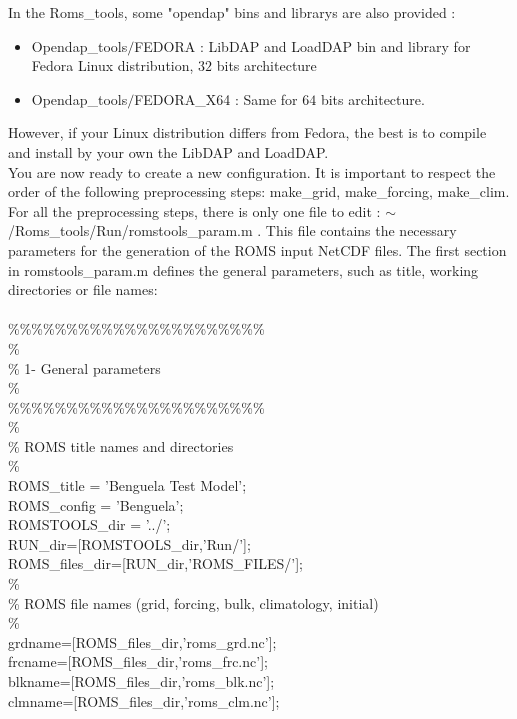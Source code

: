 In the Roms\_tools, some "opendap" bins and librarys are also provided :
\begin{itemize}
\item Opendap\_tools$/$FEDORA : LibDAP and LoadDAP bin and library for Fedora Linux
  distribution, $32$ bits architecture
\item Opendap\_tools$/$FEDORA\_X64 : Same for $64$ bits architecture.
\end{itemize}
However, if your Linux distribution differs from Fedora, the best is to compile and
install by your own the LibDAP and LoadDAP. \\


You are now ready to create a new configuration.  It is important to
respect the order of the following preprocessing steps: make\_grid,
make\_forcing, make\_clim.  For all the preprocessing steps, there is
only one file to edit : $\sim$/Roms\_tools/Run/romstools\_param.m .
This file contains the necessary parameters for the generation of the
ROMS input NetCDF files.  The first section in romstools\_param.m
defines the general parameters, such as title, working directories or
file names:
\\ \\
\%\%\%\%\%\%\%\%\%\%\%\%\%\%\%\%\%\%\%\%\%\%\\
\%\\
\% 1- General parameters\\
\%\\
\%\%\%\%\%\%\%\%\%\%\%\%\%\%\%\%\%\%\%\%\%\%\\
\%\\
\%  ROMS title names and directories\\
\%\\
ROMS\_title  = 'Benguela Test Model';\\
ROMS\_config = 'Benguela';\\
ROMSTOOLS\_dir = '../';\\
RUN\_dir=[ROMSTOOLS\_dir,'Run/'];\\
ROMS\_files\_dir=[RUN\_dir,'ROMS\_FILES/'];\\
\%\\
\% ROMS file names (grid, forcing, bulk, climatology, initial)\\
\%\\
grdname=[ROMS\_files\_dir,'roms\_grd.nc'];\\
frcname=[ROMS\_files\_dir,'roms\_frc.nc'];\\
blkname=[ROMS\_files\_dir,'roms\_blk.nc'];\\
clmname=[ROMS\_files\_dir,'roms\_clm.nc'];\\
